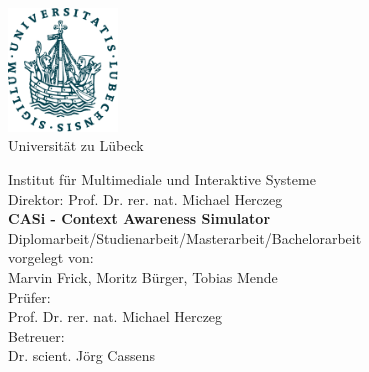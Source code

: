 \documentclass[11pt,    %
  english,ngerman,      %
  paper=a4,             %
  oneside,              %
  tablecaptionbelow,    %
  DIV=calc              %
  ]{scrbook}            %
\begin{document}
\frontmatter


\thispagestyle{empty}
\vspace*{-2.2cm}
\begin{center}
  \includegraphics[width=2.9cm]{pics/uni-siegel.pdf}\\

  \vspace{.5cm}
  {
  \fontsize{16pt}{10pt}\selectfont
  Universität zu Lübeck\\
  }

  \vspace{.65cm}
  {
    \fontsize{14pt}{19pt}\selectfont
    Institut für Multimediale und Interaktive Systeme\\
    Direktor: Prof. Dr. rer. nat. Michael Herczeg\\
  }
  \vspace{2.5cm}
  {
    \fontsize{22pt}{22pt}\selectfont
    \bfseries
    CASi - Context Awareness Simulator \\}
  \vspace{1.5cm}
  {
    \fontsize{16pt}{16pt}\selectfont
    Diplomarbeit/Studienarbeit/Masterarbeit/Bachelorarbeit \\
  }
  \vspace{1.5cm}
  {
    \fontsize{13pt}{13pt}\selectfont
    vorgelegt von:\\
    \vspace{10pt}
  Marvin Frick, Moritz Bürger, Tobias Mende\\
  }
  \vspace{2.5cm}
  {
    \fontsize{13pt}{13pt}\selectfont
    Prüfer:\\
    \vspace{10pt}
    Prof. Dr. rer. nat. Michael Herczeg\\
  }
  \vspace{1.5cm}
  {
    \fontsize{13pt}{13pt}\selectfont
    Betreuer:\\
    \vspace{10pt}
    Dr. scient. Jörg Cassens
  }
\end{center}
\end{document}
